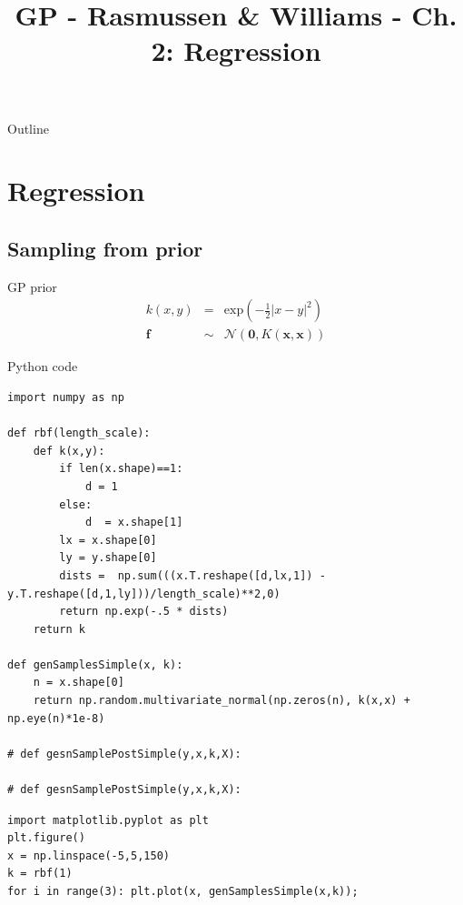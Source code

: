 \documentclass[presentation]{beamer}
\date{}
\title{GP - Rasmussen \& Williams - Ch. 2: Regression}
\begin{document}
\maketitle
\begin{frame}{Outline}
\tableofcontents
\end{frame}




\section{Regression}
\label{sec:orge261175}
\subsection{Sampling from prior}
\label{sec:org7e8b7e8}
\begin{frame}[label={sec:org0f401ca}]{GP prior}
\begin{eqnarray} \label{eg:GP}
k({x},{y}) & = & \mathrm{exp}( -\tfrac{1}{2}|{x}-{y}|^2) \\
\mathbf{f} & \sim & \mathcal{N}(\mathbf{0}, K(\mathbf{x}, \mathbf{x}))
\end{eqnarray}
\end{frame}


\begin{frame}[fragile,label={sec:orgce67762}]{Python code}
 \begin{verbatim}
import numpy as np

def rbf(length_scale):
    def k(x,y):
        if len(x.shape)==1:
            d = 1
        else:
            d  = x.shape[1]
        lx = x.shape[0]
        ly = y.shape[0]
        dists =  np.sum(((x.T.reshape([d,lx,1]) -  y.T.reshape([d,1,ly]))/length_scale)**2,0)
        return np.exp(-.5 * dists)
    return k

def genSamplesSimple(x, k):
    n = x.shape[0]
    return np.random.multivariate_normal(np.zeros(n), k(x,x) + np.eye(n)*1e-8)

# def gesnSamplePostSimple(y,x,k,X):

# def gesnSamplePostSimple(y,x,k,X):
\end{verbatim}

\begin{verbatim}
import matplotlib.pyplot as plt
plt.figure()
x = np.linspace(-5,5,150)
k = rbf(1)
for i in range(3): plt.plot(x, genSamplesSimple(x,k));
\end{verbatim}
\end{frame}
\end{document}
